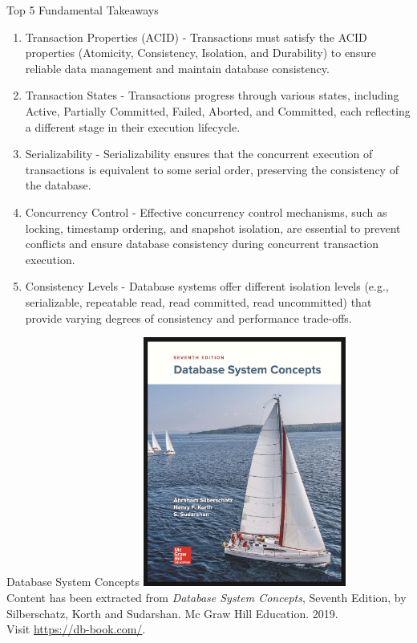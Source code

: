 \documentclass{beamer}
\begin{document}
\begin{frame}{Top 5 Fundamental Takeaways}
    \footnotesize
    \begin{enumerate} \pause
        \item[5] Transaction Properties (ACID) - Transactions must satisfy the ACID properties (Atomicity, Consistency, Isolation, and Durability) to ensure reliable data management and maintain database consistency. \pause

        \item[4] Transaction States - Transactions progress through various states, including Active, Partially Committed, Failed, Aborted, and Committed, each reflecting a different stage in their execution lifecycle. \pause

        \item[3] Serializability - Serializability ensures that the concurrent execution of transactions is equivalent to some serial order, preserving the consistency of the database. \pause

        \item[2] Concurrency Control - Effective concurrency control mechanisms, such as locking, timestamp ordering, and snapshot isolation, are essential to prevent conflicts and ensure database consistency during concurrent transaction execution. \pause

        \item[1] Consistency Levels - Database systems offer different isolation levels (e.g., serializable, repeatable read, read committed, read uncommitted) that provide varying degrees of consistency and performance trade-offs.
    \end{enumerate}
\end{frame}

\begin{frame}{Database System Concepts}
    \centering
    \includegraphics[width=0.5\textwidth]{figures/book_cover.jpg} \\
    \vspace{5mm}
    {
        \tiny
        Content has been extracted from \textit{Database System Concepts}, Seventh Edition, by Silberschatz, Korth and Sudarshan. Mc Graw Hill Education. 2019.\\
        Visit \url{https://db-book.com/}.\\
    }
\end{frame}
\end{document}
